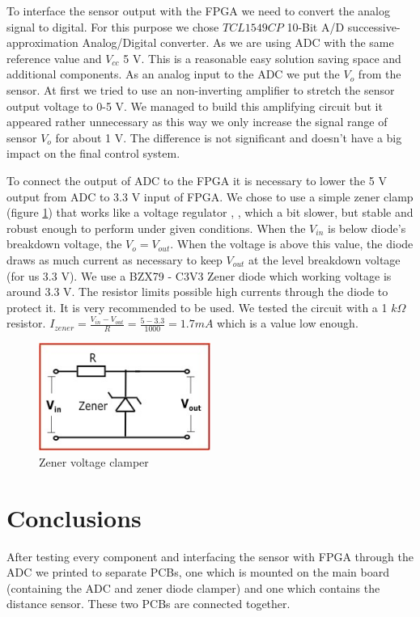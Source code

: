 To interface the sensor output with the FPGA we need to convert the analog signal to digital. For this purpose we chose $TCL 1549CP$ 10-Bit A/D  successive-approximation Analog/Digital converter. As we are using ADC with the same reference value and $V_{cc}$ 5 V. This is a reasonable easy solution saving space and additional components. As an analog input to the ADC we put the $V_{o}$ from the sensor. At first we tried to use an non-inverting amplifier to stretch the sensor output voltage to 0-5 V. We managed to build this amplifying circuit but it appeared rather unnecessary as this way we only increase the signal range of sensor $V_{o}$ for about 1 V. The difference is not significant and doesn't have a big impact on the final control system. 

To connect the output of ADC to the FPGA it is necessary to  lower the 5 V output from ADC to 3.3 V input of FPGA.  We chose to use a simple zener clamp (figure \ref{fig:zener}) that works like a voltage regulator \cite{inventors}, \cite{tricks}, which a bit slower, but stable and robust enough to perform under given conditions. When the $V_{in}$  is below diode's breakdown voltage, the $V_{o} = V_{out} $. When the voltage is above this value, the diode draws as much current as necessary to keep $V_{out}$ at the level breakdown voltage (for us 3.3 V). 
We use a BZX79 - C3V3 Zener diode which working voltage is around 3.3 V. The resistor limits possible high currents through the diode to protect it. It is very recommended to be used. We tested the circuit with a 1 $k\Omega$ resistor. $I_{zener}=\frac{V_{in}-V_{out}}{R}=\frac{5-3.3}{1000}= 1.7 mA$  which is a value low enough. 

\begin{figure}[!ht]
	\centering
	\includegraphics[width=0.5\textwidth]{figures/zener}
	\caption{Zener voltage clamper}
	\label{fig:zener}
\end{figure}


\newpage
\section{Conclusions}
After testing every component and interfacing the sensor with FPGA through the ADC we printed to separate PCBs, one which is mounted on the main board (containing the ADC and zener diode clamper) and one which contains the distance sensor. These two PCBs are connected together. 

